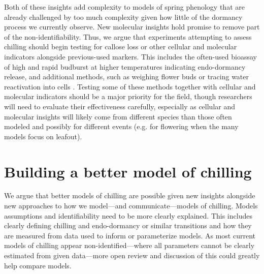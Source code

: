 \documentclass[11pt]{article}
\begin{document}

Both of these insights add complexity to models of spring phenology that are already challenged by too much complexity given how little of the dormancy process we currently observe.  
New molecular insights hold promise to remove part of the non-identifiability. Thus, we argue that experiments attempting to assess chilling should begin testing for callose loss or other   cellular and molecular indicators alongside previous-used markers. This includes the often-used bioassay of high and rapid budburst at higher temperatures indicating endo-dormancy release, and additional methods, such as weighing flower buds \citep{chuine2016} or tracing water reactivation into cells \citep{faust1991bound,Kalcsits2009}. Testing some of these methods together with cellular and molecular indicators should be a major priority for the field, though researchers will need to evaluate their effectiveness carefully, especially as cellular and molecular insights will likely come from different species than those often modeled and possibly for different events (e.g. for flowering when the many models focus on leafout). %


\section*{Building a better model of chilling} %

We argue that better models of chilling are possible given new insights alongside new approaches to how we model---and communicate---models of chilling. Models assumptions and identifiability need to be more clearly explained. This includes clearly defining chilling and endo-dormancy or similar transitions and how they are measured from data used to inform or parameterize models. As most current models of chilling appear non-identified---where all parameters cannot be clearly estimated from given data---more open review and discussion of this could greatly help compare models. 
\end{document}
